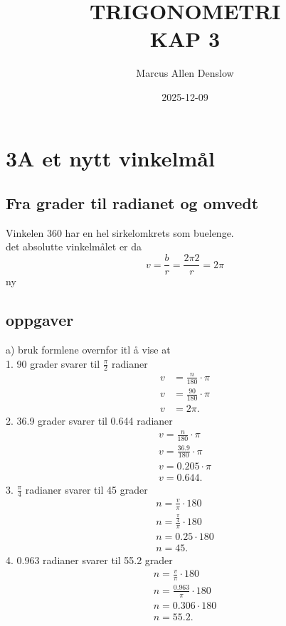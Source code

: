 \documentclass{report}
\title{\Huge{TRIGONOMETRI}\\ KAP 3}
\author{\Huge{Marcus Allen Denslow}}
\date{2025-12-09}
\begin{document}
\maketitle
\newpage%
\tableofcontents
\pagebreak

\chapter{3A et nytt vinkelmål}
\section{Fra grader til radianet og omvedt}

Vinkelen 360 har en hel sirkelomkrets som buelenge.\\
det absolutte vinkelmålet er da
\begin{equation}
    v = \frac{b}{r} = \frac{2\pi 2}{r} = 2\pi
\end{equation}
ny
\section{oppgaver}
a) bruk formlene overnfor itl å vise at\\
1. 90 grader svarer til $\frac{\pi}{2}$ radianer
\begin{align*}
	v &= \frac{n}{180}\cdot \pi\\
	v &= \frac{90}{180}\cdot \pi\\
	v &= 2\pi
.\end{align*}
2. 36.9 grader svarer til 0.644 radianer
\begin{align*}
    v = \frac{n}{180}\cdot \pi \\
	v = \frac{36.9}{180}\cdot \pi \\
	v = 0.205\cdot \pi \\
	v = 0.644
.\end{align*}
3. $\frac{\pi}{4}$ radianer svarer til 45 grader\\
\begin{align*}
    n = \frac{v}{\pi}\cdot 180\\
	n = \frac{\frac{\pi}{4}}{\pi}\cdot 180\\
	n = 0.25 \cdot 180\\
	n = 45
.\end{align*}
4. 0.963 radianer svarer til 55.2 grader
\begin{align*}
    n = \frac{v}{\pi}\cdot 180\\
	n = \frac{0.963}{\pi}\cdot 180\\
	n = 0.306 \cdot 180\\
	n = 55.2
.\end{align*}
\end{document}
